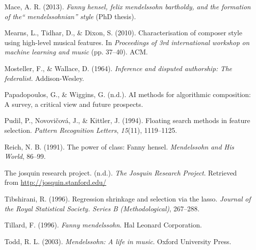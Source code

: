 \documentclass[12pt,twoside]{reedthesis}
\theoremstyle{definition}
\theoremstyle{definition}
\theoremstyle{definition}
\theoremstyle{remark}
\begin{document}
\hypertarget{ref-mace2013}{}
Mace, A. R. (2013). \emph{Fanny hensel, felix mendelssohn bartholdy, and
the formation of the`` mendelssohnian'' style} (PhD thesis).

\hypertarget{ref-mearns2010}{}
Mearns, L., Tidhar, D., \& Dixon, S. (2010). Characterisation of
composer style using high-level musical features. In \emph{Proceedings
of 3rd international workshop on machine learning and music} (pp.
37--40). ACM.

\hypertarget{ref-mosteller1964inference}{}
Mosteller, F., \& Wallace, D. (1964). \emph{Inference and disputed
authorship: The federalist}. Addison-Wesley.

\hypertarget{ref-papadopoulosai}{}
Papadopoulos, G., \& Wiggins, G. (n.d.). AI methods for algorithmic
composition: A survey, a critical view and future prospects.

\hypertarget{ref-pudil1994floating}{}
Pudil, P., Novovičová, J., \& Kittler, J. (1994). Floating search
methods in feature selection. \emph{Pattern Recognition Letters},
\emph{15}(11), 1119--1125.

\hypertarget{ref-reich1991}{}
Reich, N. B. (1991). The power of class: Fanny hensel. \emph{Mendelssohn
and His World}, 86--99.

\hypertarget{ref-jrp}{}
The josquin research project. (n.d.). \emph{The Josquin Research
Project}. Retrieved from \url{http://josquin.stanford.edu/}

\hypertarget{ref-lasso}{}
Tibshirani, R. (1996). Regression shrinkage and selection via the lasso.
\emph{Journal of the Royal Statistical Society. Series B
(Methodological)}, 267--288.

\hypertarget{ref-tillard1996}{}
Tillard, F. (1996). \emph{Fanny mendelssohn}. Hal Leonard Corporation.

\hypertarget{ref-todd2003}{}
Todd, R. L. (2003). \emph{Mendelssohn: A life in music}. Oxford
University Press.


\end{document}
